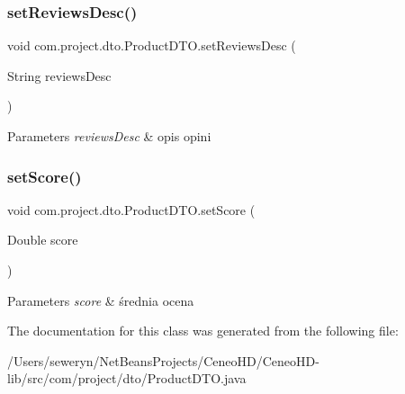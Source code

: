 \subsubsection{set\+Reviews\+Desc()}
{\footnotesize\ttfamily void com.\+project.\+dto.\+Product\+D\+T\+O.\+set\+Reviews\+Desc (\begin{DoxyParamCaption}\item[{String}]{reviews\+Desc }\end{DoxyParamCaption})}


\begin{DoxyParams}{Parameters}
{\em reviews\+Desc} & opis opini \\
\hline
\end{DoxyParams}
\mbox{\label{classcom_1_1project_1_1dto_1_1_product_d_t_o_a17541864e8cfff6303e958139eb1a3a9}} 
\subsubsection{set\+Score()}
{\footnotesize\ttfamily void com.\+project.\+dto.\+Product\+D\+T\+O.\+set\+Score (\begin{DoxyParamCaption}\item[{Double}]{score }\end{DoxyParamCaption})}


\begin{DoxyParams}{Parameters}
{\em score} & średnia ocena \\
\hline
\end{DoxyParams}


The documentation for this class was generated from the following file\+:\begin{DoxyCompactItemize}
\item 
/\+Users/seweryn/\+Net\+Beans\+Projects/\+Ceneo\+H\+D/\+Ceneo\+H\+D-\/lib/src/com/project/dto/Product\+D\+T\+O.\+java\end{DoxyCompactItemize}
